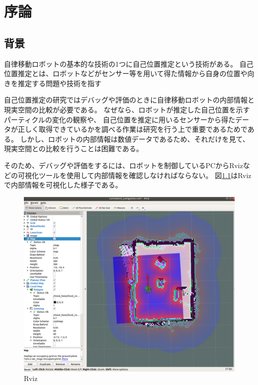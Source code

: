 \chapter{序論}

\section{背景}
自律移動ロボットの基本的な技術の1つに自己位置推定という技術がある。
自己位置推定とは、ロボットなどがセンサー等を用いて得た情報から自身の位置や向きを推定する問題や技術を指す

自己位置推定の研究ではデバッグや評価のときに自律移動ロボットの内部情報と現実空間の比較が必要である。
なぜなら、ロボットが推定した自己位置を示すパーティクルの変化の観察や、
自己位置を推定に用いるセンサーから得たデータが正しく取得できているかを調べる作業は研究を行う上で重要であるためである。
しかし、ロボットの内部情報は数値データであるため、それだけを見て、現実空間との比較を行うことは困難である。

そのため、デバッグや評価をするには、ロボットを制御しているPCからRvizなどの可視化ツールを使用して内部情報を確認しなければならない。
図\ref{Rviz}はRvizで内部情報を可視化した様子である。

\begin{figure}[H]
	\begin{center}
		\includegraphics[width=1.0\linewidth]{figs/Rviz.png}
		\caption{Rviz}
		\label{Rviz}
	\end{center}
\end{figure}

